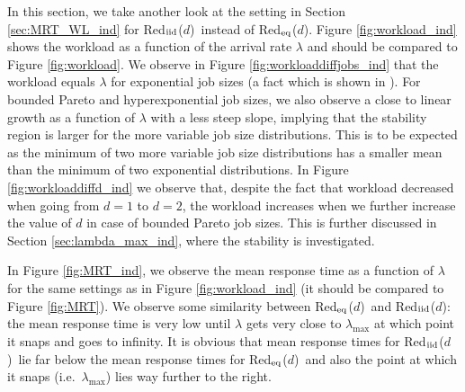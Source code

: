 \documentclass[12pt]{report}
\newcommand{\Redid}{Red$_{\textup{eq}}$($d$)}
\newcommand{\Redind}{Red$_{\textup{iid}}$($d$)}
\begin{document}
In this section, we take another look at the setting in Section \ref{sec:MRT_WL_ind} for \Redind\ instead of \Redid . Figure \ref{fig:workload_ind} shows the workload as a function of the arrival rate $\lambda$ and should be compared to Figure \ref{fig:workload}. We observe in Figure \ref{fig:workloaddiffjobs_ind} that the workload equals $\lambda$ for exponential job sizes (a fact which is shown in \cite{gardnerOR}). For bounded Pareto and hyperexponential job sizes, we also observe a close to linear growth as a function of $\lambda$ with a less steep slope, implying that the stability region is larger for the more variable job size distributions. This is to be expected as the minimum of two more variable job size distributions has a smaller mean than the minimum of two exponential distributions. In Figure \ref{fig:workloaddiffd_ind} we observe that, despite the fact that workload decreased when going from $d=1$ to $d=2$, the workload increases when we further increase the value of $d$ in case of bounded
Pareto job sizes. This is further discussed in Section \ref{sec:lambda_max_ind}, where the stability is investigated.

In Figure \ref{fig:MRT_ind}, we observe the mean response time as a function of $\lambda$ for the same settings as in Figure \ref{fig:workload_ind} (it should be compared to Figure \ref{fig:MRT}). We observe some similarity between \Redid\ and \Redind : the mean response time is very low until $\lambda$ gets very close to $\lambda_{\max}$ at which point it snaps and goes to infinity. It is obvious that mean response times for \Redind\ lie far below the mean response times for \Redid\ and also the point at which it snaps (i.e.~$\lambda_{\max}$) lies way further to the right.
\end{document}
